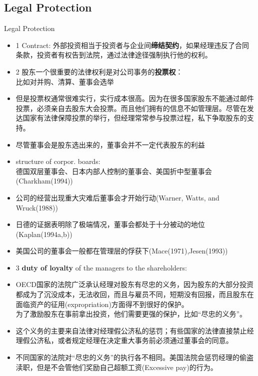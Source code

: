 \subsection{Legal Protection}%
	\begin{frame}{Legal Protection}
	\begin{itemize}
	\item 1 Contract: 外部投资相当于投资者与企业间\textbf{缔结契约}，如果经理违反了合同条款，投资者有权告到法院，通过法律途径强制执行他的权利。
	\item 2 股东一个很重要的法律权利是对公司事务的\textbf{投票权}：\\
	比如对并购、清算、董事会选举
	\item 但是投票权通常很难实行，实行成本很高。因为在很多国家股东不能通过邮件投票，必须亲自去股东大会投票。而且他们拥有的信息不如管理层。尽管在发达国家有法律保障投票的举行，但经理常常参与投票过程，私下争取股东的支持。
\end{itemize}
\end{frame}
	
	\begin{frame}{}
	\begin{itemize}
	\item 尽管董事会是股东选出来的，董事会并不一定代表股东的利益\\
	\item structure of corpor. boards: \\
	德国双层董事会、日本内部人控制的董事会、美国折中型董事会(Charkham(1994))\\
	\item 公司的经营出现重大灾难后董事会才开始行动(Warner, Watts, and Wruck(1988))\\
	\item 日德的证据表明除了极端情况，董事会都处于十分被动的地位(Kaplan(1994a,b))\\
	\item 美国公司的董事会一般都在管理层的俘获下(Mace(1971),Jesen(1993))
\end{itemize}
\end{frame}
	

	\begin{frame}{}
	\begin{itemize}
	\item 3 \textbf{duty of loyalty} of the managers to the shareholders:
	\item  OECD国家的法院广泛承认经理对股东有尽忠的义务，因为股东的大部分投资都成为了沉没成本，无法收回，而且与雇员不同，短期没有回报，而且股东在面临资产的征用(expropriation)方面得不到很好的保护。\\
	为了激励股东在事前拿出投资，他们需要更强的保护，比如“尽忠的义务”。
	\item 这个义务的主要来自法律对经理假公济私的惩罚；有些国家的法律直接禁止经理假公济私，或者规定经理在决定重大事务前必须通过董事会的同意。
	\item 不同国家的法院对“尽忠的义务”的执行各不相同。美国法院会惩罚经理的偷盗渎职，但是不会管他们奖励自己超额工资(Excessive pay)的行为。
\end{itemize}
\end{frame}

